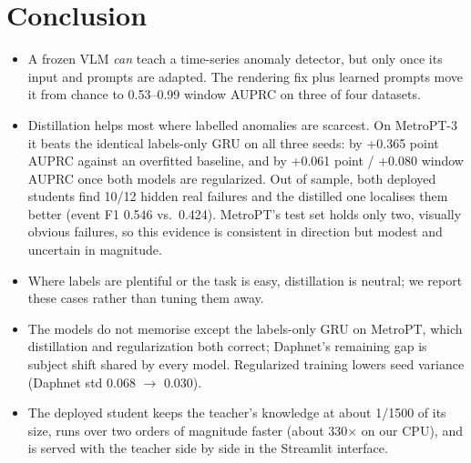 \documentclass[twoside,english]{article}
\begin{document}
\section{Conclusion} \label{sec:conclusion}
\begin{itemize}[leftmargin=*,nosep]
\item A frozen VLM \emph{can} teach a time-series anomaly detector, but only once its input and prompts are adapted. The rendering fix plus learned prompts move it from chance to 0.53--0.99 window AUPRC on three of four datasets.
\item Distillation helps most where labelled anomalies are scarcest. On MetroPT-3 it beats the identical labels-only GRU on all three seeds: by +0.365 point AUPRC against an overfitted baseline, and by +0.061 point / +0.080 window AUPRC once both models are regularized. Out of sample, both deployed students find 10/12 hidden real failures and the distilled one localises them better (event F1 0.546 vs.\ 0.424). MetroPT's test set holds only two, visually obvious failures, so this evidence is consistent in direction but modest and uncertain in magnitude.
\item Where labels are plentiful or the task is easy, distillation is neutral; we report these cases rather than tuning them away.
\item The models do not memorise except the labels-only GRU on MetroPT, which distillation and regularization both correct; Daphnet's remaining gap is subject shift shared by every model. Regularized training lowers seed variance (Daphnet std 0.068 $\rightarrow$ 0.030).
\item The deployed student keeps the teacher's knowledge at about 1/1500 of its size, runs over two orders of magnitude faster (about 330$\times$ on our CPU), and is served with the teacher side by side in the Streamlit interface.
\end{itemize}
\end{document}
